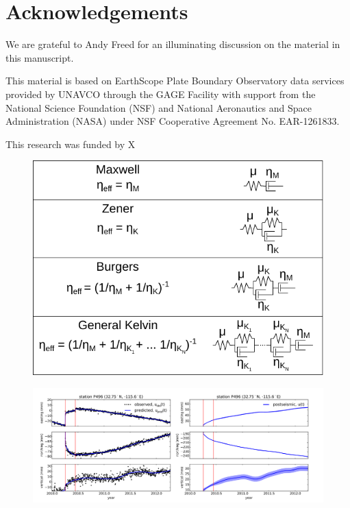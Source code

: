 \documentclass[1p]{elsarticle}
\begin{document}
\section*{Acknowledgements}
We are grateful to Andy Freed for an illuminating discussion on the material in this manuscript.  
 
This material is based on EarthScope Plate Boundary Observatory data services provided by UNAVCO through the GAGE Facility with support from the National Science Foundation (NSF) and National Aeronautics and Space Administration (NASA) under NSF Cooperative Agreement No. EAR-1261833.

This research was funded by X






\begin{figure}
\includegraphics[scale=0.9]{Figures/rheology}
\centering 
\caption{}
\label{fig:Rheology}
\end{figure}

\begin{figure}
\includegraphics[scale=0.45]{Figures/filterP496}
\centering
\caption{}
\label{fig:P496}
\end{figure}
\end{document}
